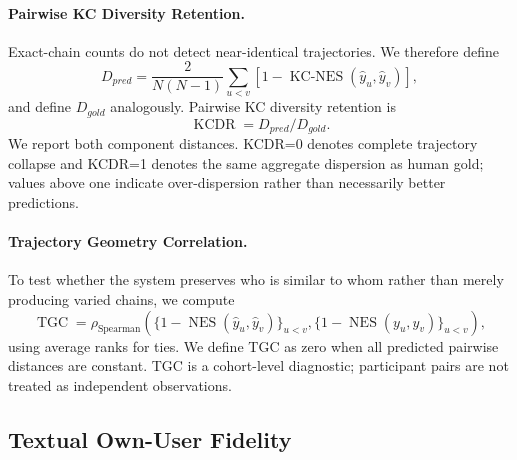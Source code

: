 \paragraph{Pairwise KC Diversity Retention.}
Exact-chain counts do not detect near-identical trajectories. We therefore define
\begin{equation}
D_{pred}=\frac{2}{N(N-1)}\sum_{u<v}
\left[1-\operatorname{KC\text{-}NES}(\hat y_u,\hat y_v)\right],
\end{equation}
and define $D_{gold}$ analogously. Pairwise KC diversity retention is
\begin{equation}
\operatorname{KCDR}=D_{pred}/D_{gold}.
\end{equation}
We report both component distances. KCDR=0 denotes complete trajectory collapse and KCDR=1 denotes the same aggregate dispersion as human gold; values above one indicate over-dispersion rather than necessarily better predictions.

\paragraph{Trajectory Geometry Correlation.}
To test whether the system preserves who is similar to whom rather than merely producing varied chains, we compute
\begin{equation}
\operatorname{TGC}=\rho_{\mathrm{Spearman}}
\left(\{1-\operatorname{NES}(\hat y_u,\hat y_v)\}_{u<v},
\{1-\operatorname{NES}(y_u,y_v)\}_{u<v}\right),
\end{equation}
using average ranks for ties. We define TGC as zero when all predicted pairwise distances are constant. TGC is a cohort-level diagnostic; participant pairs are not treated as independent observations.

\subsection{Textual Own-User Fidelity}

